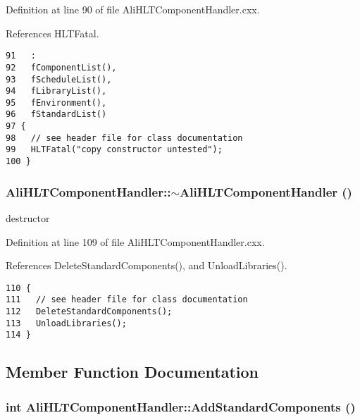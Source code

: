 Definition at line 90 of file Ali\-HLTComponent\-Handler.cxx.

References HLTFatal.

\footnotesize\begin{verbatim}91   :
92   fComponentList(),
93   fScheduleList(),
94   fLibraryList(),
95   fEnvironment(),
96   fStandardList()
97 {
98   // see header file for class documentation
99   HLTFatal("copy constructor untested");
100 }

\end{verbatim}\normalsize 


\subsubsection{\setlength{\rightskip}{0pt plus 5cm}Ali\-HLTComponent\-Handler::$\sim${\bf Ali\-HLTComponent\-Handler} ()\hspace{0.3cm}{\tt  [virtual]}}\label{classAliHLTComponentHandler_a4}


destructor 

Definition at line 109 of file Ali\-HLTComponent\-Handler.cxx.

References Delete\-Standard\-Components(), and Unload\-Libraries().

\footnotesize\begin{verbatim}110 {
111   // see header file for class documentation
112   DeleteStandardComponents();
113   UnloadLibraries();
114 }
\end{verbatim}\normalsize 




\subsection{Member Function Documentation}
\subsubsection{\setlength{\rightskip}{0pt plus 5cm}int Ali\-HLTComponent\-Handler::Add\-Standard\-Components ()}\label{classAliHLTComponentHandler_a13}


